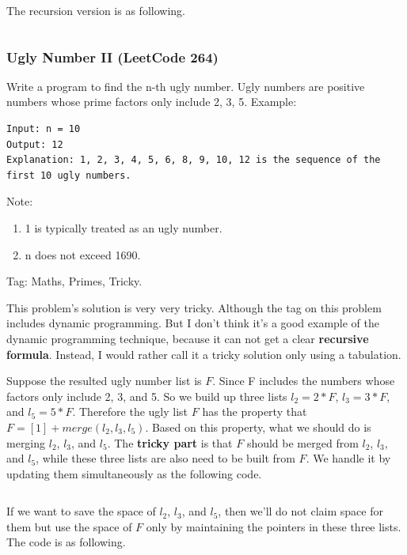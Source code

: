 \documentclass[11pt]{article}
\begin{document}
The recursion version is as following. 
\inputminted[breaklines=true,frame=leftline, linenos=true]{python}{src/isUgly_recursion.py}

\subsubsection{Ugly Number II (LeetCode 264)}
Write a program to find the n-th ugly number. 
Ugly numbers are positive numbers whose prime factors only include 2, 3, 5. 
Example:
\begin{verbatim}
Input: n = 10
Output: 12
Explanation: 1, 2, 3, 4, 5, 6, 8, 9, 10, 12 is the sequence of the first 10 ugly numbers.
\end{verbatim}
Note:  
\begin{enumerate}
\item 1 is typically treated as an ugly number.
\item n does not exceed 1690.
\end{enumerate}

Tag: Maths, Primes, Tricky.

This problem's solution is very very tricky.
Although the tag on this problem includes dynamic programming. 
But I don't think it's a good example of the dynamic programming technique, because it can not get a clear \textbf{recursive formula}.
Instead, I would rather call it a tricky solution only using a tabulation. 

Suppose the resulted ugly number list is $F$. 
Since F includes the numbers whose factors only include 2, 3, and 5. 
So we build up three lists $l_2=2*F$, $l_3=3*F$, and $l_5=5*F$.
Therefore the ugly list $F$ has the property that $F=[1]+ merge(l_2,l_3,l_5)$.
Based on this property, what we should do is merging $l_2$, $l_3$, and $l_5$. 
The \textbf{tricky part} is that $F$ should be merged from $l_2$, $l_3$, and $l_5$, while these three lists are also need to be built from $F$.
We handle it by updating them simultaneously as the following code. 

\inputminted[breaklines=true,frame=leftline, linenos=true]{python}{src/uglyNumberII.py}

If we want to save the space of $l_2$, $l_3$, and $l_5$, then we'll do not claim space for them but use the space of $F$ only by maintaining the pointers in these three lists. The code is as following.
\inputminted[breaklines=true,frame=leftline, linenos=true]{python}{src/uglyNumberII_singleList.py}

\end{document}
